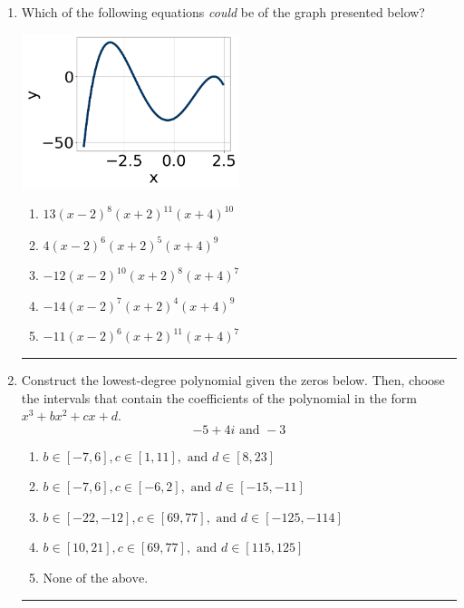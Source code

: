 \documentclass[14pt]{extbook}
\newcommand{\litem}[1]{\item#1\hspace*{-1cm}\rule{\textwidth}{0.4pt}}
\begin{document}
\begin{enumerate}
{\begin{enumerate}[label=\Alph*.]
\end{enumerate} }
\litem{
Which of the following equations \textit{could} be of the graph presented below?
\begin{center}
    \includegraphics[width=0.5\textwidth]{../Figures/polyGraphToFunctionB.png}
\end{center}
\begin{enumerate}[label=\Alph*.]
\item \( 13(x - 2)^{8} (x + 2)^{11} (x + 4)^{10} \)
\item \( 4(x - 2)^{6} (x + 2)^{5} (x + 4)^{9} \)
\item \( -12(x - 2)^{10} (x + 2)^{8} (x + 4)^{7} \)
\item \( -14(x - 2)^{7} (x + 2)^{4} (x + 4)^{9} \)
\item \( -11(x - 2)^{6} (x + 2)^{11} (x + 4)^{7} \)

\end{enumerate} }
\litem{
Construct the lowest-degree polynomial given the zeros below. Then, choose the intervals that contain the coefficients of the polynomial in the form $x^3+bx^2+cx+d$.\[ -5 + 4 i \text{ and } -3 \]\begin{enumerate}[label=\Alph*.]
\item \( b \in [-7, 6], c \in [1, 11], \text{ and } d \in [8, 23] \)
\item \( b \in [-7, 6], c \in [-6, 2], \text{ and } d \in [-15, -11] \)
\item \( b \in [-22, -12], c \in [69, 77], \text{ and } d \in [-125, -114] \)
\item \( b \in [10, 21], c \in [69, 77], \text{ and } d \in [115, 125] \)
\item \( \text{None of the above.} \)


\end{enumerate}}
\end{enumerate}
\end{document}
